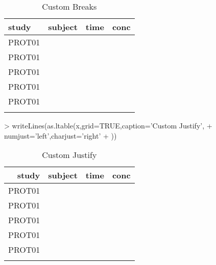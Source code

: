 \documentclass[titlepage]{article}
\begin{document}
\begin{Schunk}
\begin{table}[H]
 \caption[Custom Breaks]{Custom Breaks }
 \begin{center}
  \begin{tabular}{lr||rr}
    \hline \hline
   study & subject & time & conc \\ \hline
   PROT01 & \verb#1001# & \verb#0# & \verb#0.12# \\
   PROT01 & \verb#1001# & \verb#1# & \verb#34.00# \\
   PROT01 & \verb#1001# & \verb#2# & \verb#5.60# \\ \hline
   PROT01 & \verb#1002# & \verb#0# & \verb#0.50# \\
   PROT01 & \verb#1002# & \verb#1# & \verb#200.00# \\
    & \verb#1002# & \verb#2# & \verb## \\ \hline
  \end{tabular}
 \end{center}
\end{table}\end{Schunk}
\begin{Schunk}
\begin{Sinput}
> writeLines(as.ltable(x,grid=TRUE,caption='Custom Justify',
+     numjust='left',charjust='right'
+ ))
\end{Sinput}
\begin{table}[H]
 \caption[Custom Justify]{Custom Justify }
 \begin{center}
  \begin{tabular}{r|l|l|l}
    \hline \hline
   study & subject & time & conc \\ \hline
   PROT01 & \verb#1001# & \verb#0# & \verb#0.12# \\ \hline
   PROT01 & \verb#1001# & \verb#1# & \verb#34.00# \\ \hline
   PROT01 & \verb#1001# & \verb#2# & \verb#5.60# \\ \hline
   PROT01 & \verb#1002# & \verb#0# & \verb#0.50# \\ \hline
   PROT01 & \verb#1002# & \verb#1# & \verb#200.00# \\ \hline
    & \verb#1002# & \verb#2# & \verb## \\ \hline
  \end{tabular}
 \end{center}
\end{table}\end{Schunk}
\end{document}
